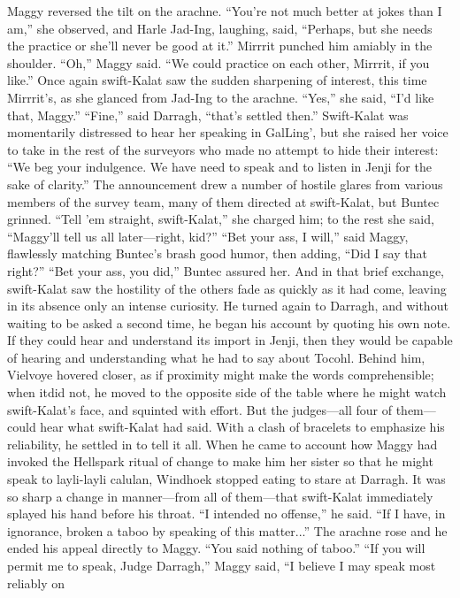 \documentclass[9pt]{article}
\begin{document}
Maggy reversed the tilt on the arachne. “You’re not much better at jokes than I am,” she observed,
and Harle Jad-Ing, laughing, said, “Perhaps, but she needs the practice or she’ll never be good at it.”
Mirrrit punched him amiably in the shoulder.
“Oh,” Maggy said. “We could practice on each other, Mirrrit, if you like.”
Once again swift-Kalat saw the sudden sharpening of interest, this time Mirrrit’s, as she glanced from
Jad-Ing to the arachne. “Yes,” she said, “I’d like that, Maggy.”
“Fine,” said Darragh, “that’s settled then.” Swift-Kalat was momentarily distressed to hear her
speaking in GalLing’, but she raised her voice to take in the rest of the surveyors who made no attempt
to hide their interest: “We beg your indulgence. We have need to speak and to listen in Jenji for the sake
of clarity.”
The announcement drew a number of hostile glares from various members of the survey team, many
of them directed at swift-Kalat, but Buntec grinned. “Tell ’em straight, swift-Kalat,” she charged him; to
the rest she said, “Maggy’ll tell us all later—right, kid?”
“Bet your ass, I will,” said Maggy, flawlessly matching Buntec’s brash good humor, then adding,
“Did I say that right?”
“Bet your ass, you did,” Buntec assured her. And in that brief exchange, swift-Kalat saw the hostility
of the others fade as quickly as it had come, leaving in its absence only an intense curiosity.
He turned again to Darragh, and without waiting to be asked a second time, he began his account by
quoting his own note. If they could hear and understand its import in Jenji, then they would be capable of
hearing and understanding what he had to say about Tocohl.
Behind him, Vielvoye hovered closer, as if proximity might make the words comprehensible; when itdid not, he moved to the opposite side of the table where he might watch swift-Kalat’s face, and
squinted with effort. But the judges—all four of them—could hear what swift-Kalat had said. With a
clash of bracelets to emphasize his reliability, he settled in to tell it all.
When he came to account how Maggy had invoked the Hellspark ritual of change to make him her
sister so that he might speak to layli-layli calulan, Windhoek stopped eating to stare at Darragh. It was
so sharp a change in manner—from all of them—that swift-Kalat immediately splayed his hand before his
throat. “I intended no offense,” he said. “If I have, in ignorance, broken a taboo by speaking of this
matter...” The arachne rose and he ended his appeal directly to Maggy. “You said nothing of taboo.”
“If you will permit me to speak, Judge Darragh,” Maggy said, “I believe I may speak most reliably on
\end{document}
